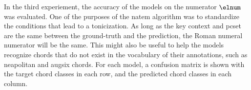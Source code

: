 
In the third experiement, the accuracy of the models on the
numerator $\elnum$ was evaluated. One of the purposes of the
\gls{natem} algorithm was to standardize the conditions that
lead to a tonicization. As long as the key context and
\gls{pcset} are the same between the ground-truth and the
prediction, the Roman numeral numerator will be the same.
This might also be useful to help the models recognize
chords that do not exist in the vocabulary of their
annotations, such as \gls{neapolitan} and \gls{augsix}
chords. For each model, a confusion matrix is shown with the
target chord classes in each row, and the predicted chord
classes in each column.

